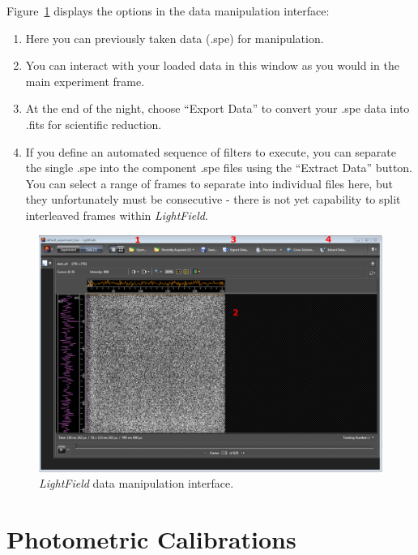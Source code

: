 \documentclass[12pt]{article}
\begin{document}
\noindent Figure~\ref{fig:data} displays the options in the data manipulation interface:
\begin{enumerate}
   \item Here you can previously taken data (.spe) for manipulation.
   \item You can interact with your loaded data in this window as you would in the main experiment frame.
   \item At the end of the night, choose ``Export Data'' to convert your .spe data into .fits for scientific reduction.
   \item If you define an automated sequence of filters to execute, you can separate the single .spe into the component .spe files using the ``Extract Data'' button. You can select a range of frames to separate into individual files here, but they unfortunately must be consecutive - there is not yet capability to split interleaved frames within \textit{LightField}.
\end{enumerate}

\begin{figure}[t]
   \centering
   \includegraphics[width=\textwidth]{LightField_data.PNG}
   \caption{\textit{LightField} data manipulation interface.\label{fig:data}}
\end{figure}

\section{Photometric Calibrations}\label{calibrations}
\end{document}
